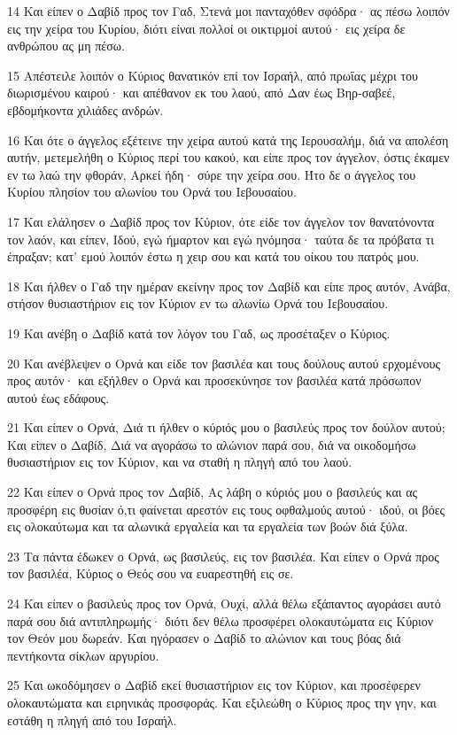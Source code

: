 \par 14 Και είπεν ο Δαβίδ προς τον Γαδ, Στενά μοι πανταχόθεν σφόδρα· ας πέσω λοιπόν εις την χείρα του Κυρίου, διότι είναι πολλοί οι οικτιρμοί αυτού· εις χείρα δε ανθρώπου ας μη πέσω.
\par 15 Απέστειλε λοιπόν ο Κύριος θανατικόν επί τον Ισραήλ, από πρωΐας μέχρι του διωρισμένου καιρού· και απέθανον εκ του λαού, από Δαν έως Βηρ-σαβεέ, εβδομήκοντα χιλιάδες ανδρών.
\par 16 Και ότε ο άγγελος εξέτεινε την χείρα αυτού κατά της Ιερουσαλήμ, διά να απολέση αυτήν, μετεμελήθη ο Κύριος περί του κακού, και είπε προς τον άγγελον, όστις έκαμεν εν τω λαώ την φθοράν, Αρκεί ήδη· σύρε την χείρα σου. Ήτο δε ο άγγελος του Κυρίου πλησίον του αλωνίου του Ορνά του Ιεβουσαίου.
\par 17 Και ελάλησεν ο Δαβίδ προς τον Κύριον, ότε είδε τον άγγελον τον θανατόνοντα τον λαόν, και είπεν, Ιδού, εγώ ήμαρτον και εγώ ηνόμησα· ταύτα δε τα πρόβατα τι έπραξαν; κατ' εμού λοιπόν έστω η χειρ σου και κατά του οίκου του πατρός μου.
\par 18 Και ήλθεν ο Γαδ την ημέραν εκείνην προς τον Δαβίδ και είπε προς αυτόν, Ανάβα, στήσον θυσιαστήριον εις τον Κύριον εν τω αλωνίω Ορνά του Ιεβουσαίου.
\par 19 Και ανέβη ο Δαβίδ κατά τον λόγον του Γαδ, ως προσέταξεν ο Κύριος.
\par 20 Και ανέβλεψεν ο Ορνά και είδε τον βασιλέα και τους δούλους αυτού ερχομένους προς αυτόν· και εξήλθεν ο Ορνά και προσεκύνησε τον βασιλέα κατά πρόσωπον αυτού έως εδάφους.
\par 21 Και είπεν ο Ορνά, Διά τι ήλθεν ο κύριός μου ο βασιλεύς προς τον δούλον αυτού; Και είπεν ο Δαβίδ, Διά να αγοράσω το αλώνιον παρά σου, διά να οικοδομήσω θυσιαστήριον εις τον Κύριον, και να σταθή η πληγή από του λαού.
\par 22 Και είπεν ο Ορνά προς τον Δαβίδ, Ας λάβη ο κύριός μου ο βασιλεύς και ας προσφέρη εις θυσίαν ό,τι φαίνεται αρεστόν εις τους οφθαλμούς αυτού· ιδού, οι βόες εις ολοκαύτωμα και τα αλωνικά εργαλεία και τα εργαλεία των βοών διά ξύλα.
\par 23 Τα πάντα έδωκεν ο Ορνά, ως βασιλεύς, εις τον βασιλέα. Και είπεν ο Ορνά προς τον βασιλέα, Κύριος ο Θεός σου να ευαρεστηθή εις σε.
\par 24 Και είπεν ο βασιλεύς προς τον Ορνά, Ουχί, αλλά θέλω εξάπαντος αγοράσει αυτό παρά σου διά αντιπληρωμής· διότι δεν θέλω προσφέρει ολοκαυτώματα εις Κύριον τον Θεόν μου δωρεάν. Και ηγόρασεν ο Δαβίδ το αλώνιον και τους βόας διά πεντήκοντα σίκλων αργυρίου.
\par 25 Και ωκοδόμησεν ο Δαβίδ εκεί θυσιαστήριον εις τον Κύριον, και προσέφερεν ολοκαυτώματα και ειρηνικάς προσφοράς. Και εξιλεώθη ο Κύριος προς την γην, και εστάθη η πληγή από του Ισραήλ.


